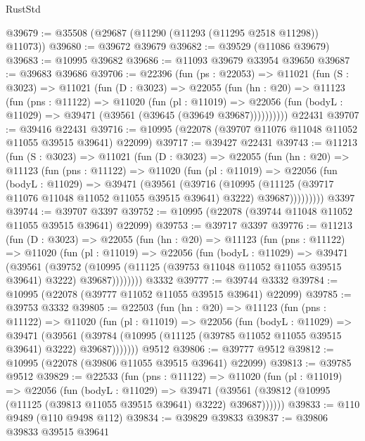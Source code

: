 \begin{lexlean}{RustStd}
\begin{coremodule}
@39679 := @35508 (@29687 (@11290 (@11293 (@11295 @2518 @11298)) @11073))
@39680 := @39672 @39679
@39682 := @39529 (@11086 @39679)
@39683 := @10995 @39682
@39686 := @11093 @39679 @33954 @39650
@39687 := @39683 @39686
@39706 := @22396
    (fun (ps : @22053) =>
    @11021
      (fun (S : @3023) =>
      @11021
        (fun (D : @3023) =>
        @22055
          (fun (hn : @20) =>
          @11123
            (fun (pns : @11122) =>
            @11020
              (fun (pl : @11019) =>
              @22056 (fun (bodyL : @11029) => @39471 (@39561 (@39645 (@39649 @39687))))))))))
    @22431
@39707 := @39416 @22431
@39716 := @10995 (@22078 (@39707 @11076 @11048 @11052 @11055 @39515 @39641) @22099)
@39717 := @39427 @22431
@39743 := @11213
    (fun (S : @3023) =>
    @11021
      (fun (D : @3023) =>
      @22055
        (fun (hn : @20) =>
        @11123
          (fun (pns : @11122) =>
          @11020
            (fun (pl : @11019) =>
            @22056
              (fun (bodyL : @11029) =>
              @39471
                (@39561
                  (@39716
                    (@10995
                      (@11125 (@39717 @11076 @11048 @11052 @11055 @39515 @39641) @3222)
                      @39687)))))))))
    @3397
@39744 := @39707 @3397
@39752 := @10995 (@22078 (@39744 @11048 @11052 @11055 @39515 @39641) @22099)
@39753 := @39717 @3397
@39776 := @11213
    (fun (D : @3023) =>
    @22055
      (fun (hn : @20) =>
      @11123
        (fun (pns : @11122) =>
        @11020
          (fun (pl : @11019) =>
          @22056
            (fun (bodyL : @11029) =>
            @39471
              (@39561
                (@39752
                  (@10995 (@11125 (@39753 @11048 @11052 @11055 @39515 @39641) @3222) @39687))))))))
    @3332
@39777 := @39744 @3332
@39784 := @10995 (@22078 (@39777 @11052 @11055 @39515 @39641) @22099)
@39785 := @39753 @3332
@39805 := @22503
    (fun (hn : @20) =>
    @11123
      (fun (pns : @11122) =>
      @11020
        (fun (pl : @11019) =>
        @22056
          (fun (bodyL : @11029) =>
          @39471
            (@39561
              (@39784 (@10995 (@11125 (@39785 @11052 @11055 @39515 @39641) @3222) @39687)))))))
    @9512
@39806 := @39777 @9512
@39812 := @10995 (@22078 (@39806 @11055 @39515 @39641) @22099)
@39813 := @39785 @9512
@39829 := @22533
    (fun (pns : @11122) =>
    @11020
      (fun (pl : @11019) =>
      @22056
        (fun (bodyL : @11029) =>
        @39471 (@39561 (@39812 (@10995 (@11125 (@39813 @11055 @39515 @39641) @3222) @39687))))))
@39833 := @110 @9489 (@110 @9498 @112)
@39834 := @39829 @39833
@39837 := @39806 @39833 @39515 @39641

\end{coremodule}
\end{lexlean}
